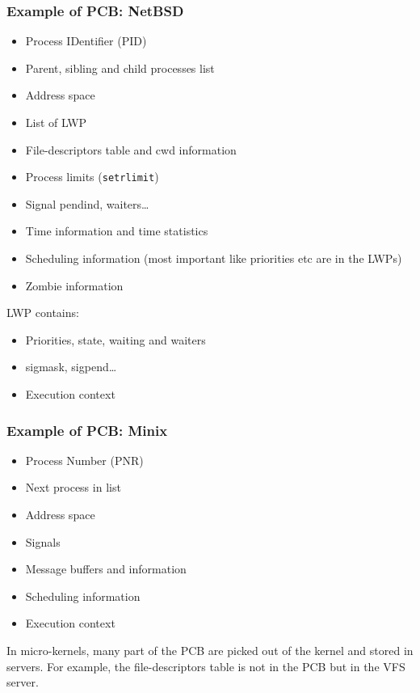 \begin{frame}[containsverbatim]
  \frametitle{Example of PCB: NetBSD}

  \begin{itemize}
  \item
    Process IDentifier (PID)
  \item
    Parent, sibling and child processes list
  \item
    Address space
  \item
    List of LWP
  \item
    File-descriptors table and cwd information
  \item
    Process limits (\verb|setrlimit|)
  \item
    Signal pendind, waiters\ldots
  \item
    Time information and time statistics
  \item
    Scheduling information (most important like priorities etc are in
    the LWPs)
   \item
    Zombie information
  \end{itemize}

  \-

  LWP contains:

  \begin{itemize}
  \item
    Priorities, state, waiting and waiters
  \item
    sigmask, sigpend\ldots
  \item
    Execution context
  \end{itemize}

\end{frame}


\begin{frame}
  \frametitle{Example of PCB: Minix}

  \begin{itemize}
  \item
    Process Number (PNR)
  \item
    Next process in list
  \item
    Address space
  \item
    Signals
  \item
    Message buffers and information
  \item
    Scheduling information
  \item
    Execution context
  \end{itemize}

  \-

  In micro-kernels, many part of the PCB are picked out of the kernel
  and stored in servers. For example, the file-descriptors table is
  not in the PCB but in the VFS server.

\end{frame}

